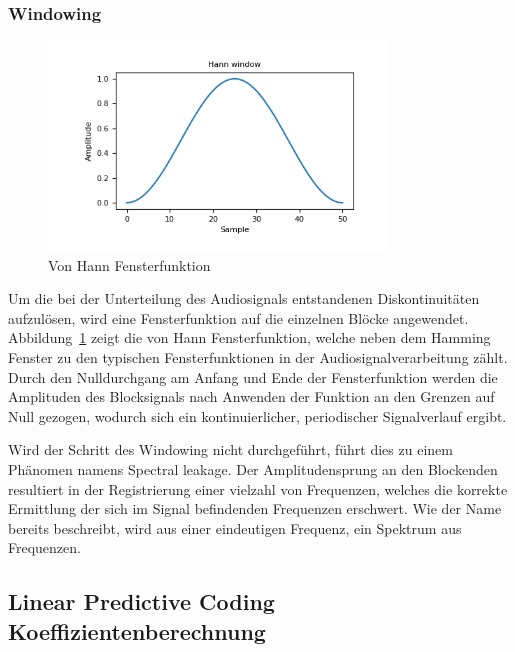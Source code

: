 \subsubsection{Windowing}
\begin{figure}
  \centering
  \includegraphics[width=0.8\textwidth, keepaspectratio]{images/hann_window.png}
  \caption{Von Hann Fensterfunktion \autocite{noauthor_numpyhanning_nodate}}
  \label{fig:vonHannFenster}
\end{figure}
Um die bei der Unterteilung des Audiosignals entstandenen Diskontinuitäten aufzulösen, wird eine Fensterfunktion auf die einzelnen Blöcke angewendet.
Abbildung~\ref{fig:vonHannFenster} zeigt die von Hann Fensterfunktion, welche neben dem Hamming Fenster zu den typischen Fensterfunktionen in der Audiosignalverarbeitung zählt.
Durch den Nulldurchgang am Anfang und Ende der Fensterfunktion werden die Amplituden des Blocksignals nach Anwenden der Funktion an den Grenzen auf Null gezogen, wodurch sich ein kontinuierlicher, periodischer Signalverlauf ergibt.

Wird der Schritt des Windowing nicht durchgeführt, führt dies zu einem Phänomen namens Spectral leakage.
Der Amplitudensprung an den Blockenden resultiert in der Registrierung einer vielzahl von Frequenzen, welches die korrekte Ermittlung der sich im Signal befindenden Frequenzen erschwert.
Wie der Name bereits beschreibt, wird aus einer eindeutigen Frequenz, ein Spektrum aus Frequenzen.

\subsection{Linear Predictive Coding Koeffizientenberechnung}
